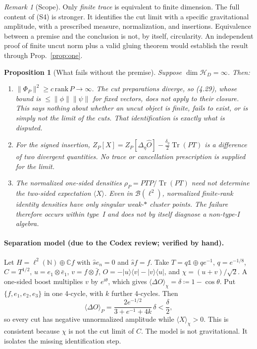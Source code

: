 \documentclass[11pt]{article}
\newtheorem{proposition}{Proposition}
\theoremstyle{remark}
\newtheorem{remark}{Remark}
\newcommand{\Tr}{\operatorname{Tr}}
\newcommand{\HD}{\mathcal H_D}
\newcommand{\one}{\mathbb 1}
\begin{document}
\begin{remark}[Scope]
Only \emph{finite trace} is equivalent to finite dimension. The full content of (S4)
is stronger. It identifies the cut limit with a specific gravitational amplitude, with
a prescribed measure, normalization, and insertions. Equivalence between a premise and
the conclusion is not, by itself, circularity. An independent proof of finite uncut
norm plus a valid gluing theorem would establish the result through
Prop.~\ref{prop:one}.
\end{remark}

\begin{proposition}[What fails without the premise]\label{prop:none}
Suppose $\dim\HD=\infty$. Then:
\begin{enumerate}
  \item $\|\Phi_P\|^2\ge c\,\mathrm{rank}\,P\to\infty$. The \emph{cut} preparations
  diverge, so (4.29), whose bound is $\le\|\phi\|\|\psi\|$ for fixed vectors, does not
  apply to their closure. This says nothing about whether an \emph{uncut} object is
  finite, fails to exist, or is simply not the limit of the cuts. That identification is
  exactly what is disputed.
  \item For the signed insertion, $Z_P[X]=Z_P[\Delta_\eta\hat O]-\tfrac{\delta_\eta}{2}
  \Tr(PT)$ is a difference of two divergent quantities. No trace or cancellation
  prescription is supplied for the limit.
  \item The normalized one-sided densities $\rho_P=PTP/\Tr(PT)$ need not determine the
  two-sided expectation $\langle X\rangle$. Even in $\mathcal B(\ell^2)$, normalized
  finite-rank identity densities have only singular weak-$*$ cluster points. The failure
  therefore occurs within type~I and does not by itself diagnose a non-type-I algebra.
\end{enumerate}
\end{proposition}

\paragraph{Separation model (due to the Codex review; verified by hand).}
Let $H=\ell^2(\mathbb N)\oplus\mathbb C f$ with $\hat s e_n=0$ and $\hat sf=f$. Take
$T=q\one\oplus qe^{-1}$, $q=e^{-1/8}$, $C=T^{1/2}$, $u=e_1\otimes\bar e_1$,
$v=f\otimes\bar f$, $O=-|u\rangle\langle v|-|v\rangle\langle u|$, and
$\chi=(u+v)/\sqrt2$. A one-sided boost multiplies $v$ by $e^{i\theta}$, which gives
$\langle\Delta O\rangle_\chi=\delta\coloneqq1-\cos\theta$. Put $\{f,e_1,e_2,e_3\}$ in
one 4-cycle, with $k$ further 4-cycles. Then
\[
\langle\Delta O\rangle_P=\frac{2e^{-1/2}}{3+e^{-1}+4k}\,\delta<\frac\delta2,
\]
so every cut has negative unnormalized amplitude while $\langle X\rangle_\chi>0$. This is
consistent because $\chi$ is not the cut limit of $C$. The model is not gravitational.
It isolates the missing identification step.
\end{document}
